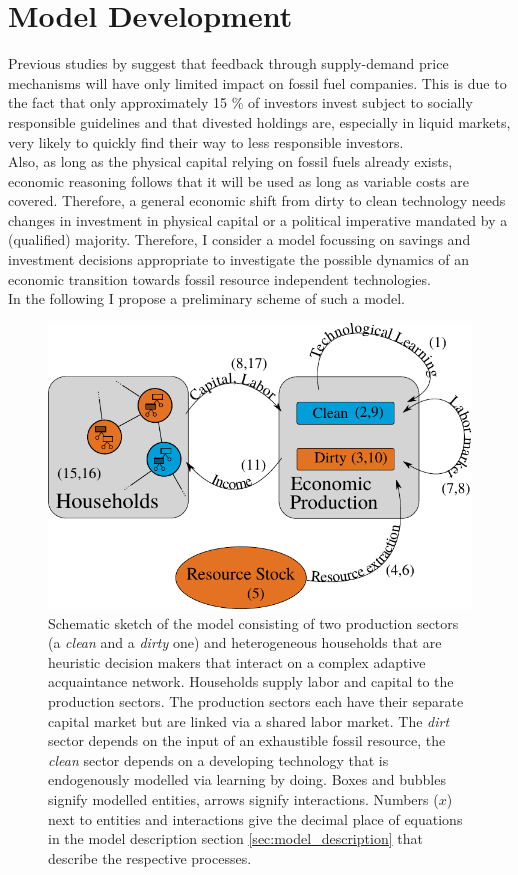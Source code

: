 \section{Model Development}  
\label{sec:heuristics_model}
Previous studies by \cite{Ans2013} suggest that feedback through supply-demand price mechanisms will have only limited impact on fossil fuel companies. This is due to the fact that only approximately 15 \% of investors invest subject to socially responsible guidelines \citep{SIF2014Report} and that divested holdings are, especially in liquid markets, very likely to quickly find their way to less responsible investors. \\
Also, as long as the physical capital relying on fossil fuels already exists, economic reasoning follows that it will be used as long as variable costs are covered.
Therefore, a general economic shift from dirty to clean technology needs changes in investment in physical capital or a political imperative mandated by a (qualified) majority. Therefore, I consider a model focussing on savings and investment decisions appropriate to investigate the possible dynamics of an economic transition towards fossil resource independent technologies.\\
In the following I propose a preliminary scheme of such a model.
\begin{figure}[t]
	\centering
	\includegraphics[width =.8 \textwidth]{figures/model_scheme_1.pdf}
        \caption[Schematic sketch of a two sector investment model with heterogeneous households that are bounded rational decision makers]{Schematic sketch of the model consisting of two production sectors (a \emph{clean} and a \emph{dirty} one) and heterogeneous households that are heuristic decision makers that interact on a complex adaptive acquaintance network. Households supply labor and capital to the production sectors. The production sectors each have their separate capital market but are linked via a shared labor market. The \emph{dirt} sector depends on the input of an exhaustible fossil resource, the \emph{clean} sector depends on a developing technology that is endogenously modelled via learning by doing. Boxes and bubbles signify modelled entities, arrows signify interactions. Numbers ($x$) next to entities and interactions give the decimal place of equations in the model description section \ref{sec:model_description} that describe the respective processes.}
	\label{fig:model}
\end{figure}

